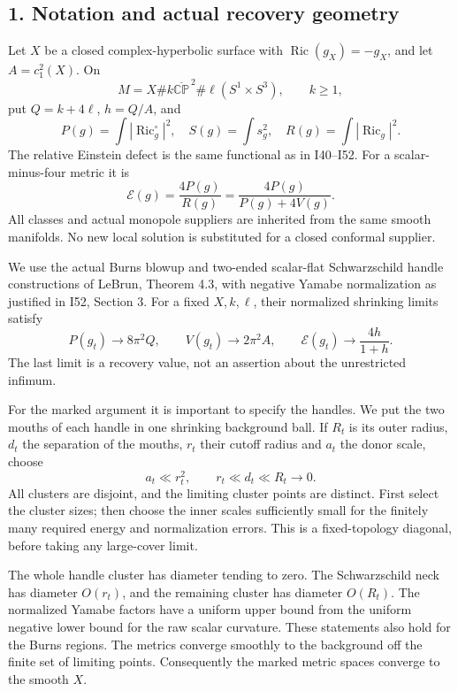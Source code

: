 \documentclass[
  10pt,
]{article}
\begin{document}
\hypertarget{notation-and-actual-recovery-geometry}{%
\subsection{1. Notation and actual recovery
geometry}\label{notation-and-actual-recovery-geometry}}

Let \(X\) be a closed complex-hyperbolic surface with
\(\operatorname{Ric}(g_X)=-g_X\), and let \(A=c_1^2(X)\). On \[
 M=X\# k\overline{\mathbb {CP}}^{\,2}
       \#\ell(S^1\times S^3),\qquad k\ge1,
\] put \(Q=k+4\ell\), \(h=Q/A\), and \[
 P(g)=\int|\operatorname{Ric}^{\circ}_g|^2,\quad
 S(g)=\int s_g^2,\quad R(g)=\int|\operatorname{Ric}_g|^2.
\] The relative Einstein defect is the same functional as in I40--I52.
For a scalar-minus-four metric it is \[
 \mathcal E(g)=\frac{4P(g)}{R(g)}
             =\frac{4P(g)}{P(g)+4V(g)}.                 \tag{1.1}
\] All classes and actual monopole suppliers are inherited from the same
smooth manifolds. No new local solution is substituted for a closed
conformal supplier.

We use the actual Burns blowup and two-ended scalar-flat Schwarzschild
handle constructions of LeBrun, Theorem 4.3, with negative Yamabe
normalization as justified in I52, Section 3. For a fixed \(X,k,\ell\),
their normalized shrinking limits satisfy \[
 P(g_t)\longrightarrow8\pi^2Q,\qquad
 V(g_t)\longrightarrow2\pi^2A,\qquad
 \mathcal E(g_t)\longrightarrow\frac{4h}{1+h}.         \tag{1.2}
\] The last limit is a recovery value, not an assertion about the
unrestricted infimum.

For the marked argument it is important to specify the handles. We put
the two mouths of each handle in one shrinking background ball. If
\(R_t\) is its outer radius, \(d_t\) the separation of the mouths,
\(r_t\) their cutoff radius and \(a_t\) the donor scale, choose \[
 a_t\ll r_t^2,\qquad r_t\ll d_t\ll R_t\longrightarrow0. \tag{1.3}
\] All clusters are disjoint, and the limiting cluster points are
distinct. First select the cluster sizes; then choose the inner scales
sufficiently small for the finitely many required energy and
normalization errors. This is a fixed-topology diagonal, before taking
any large-cover limit.

The whole handle cluster has diameter tending to zero. The Schwarzschild
neck has diameter \(O(r_t)\), and the remaining cluster has diameter
\(O(R_t)\). The normalized Yamabe factors have a uniform upper bound
from the uniform negative lower bound for the raw scalar curvature.
These statements also hold for the Burns regions. The metrics converge
smoothly to the background off the finite set of limiting points.
Consequently the marked metric spaces converge to the smooth \(X\).
\end{document}
